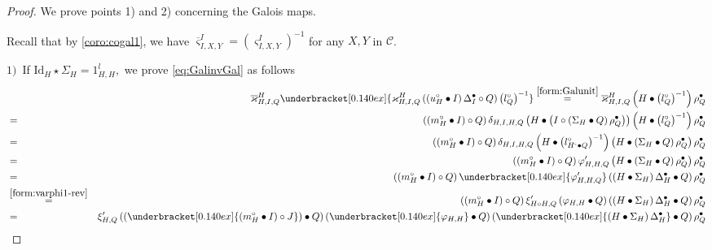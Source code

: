 \documentclass[nosumlimits,twoside]{amsart}
\theoremstyle{definition}
\theoremstyle{remark}
\def\revsn{\text{-}}
\begin{document}
\begin{proof}
We prove points 1) and 2) concerning the Galois maps.

Recall that by \cref{coro:cogal1}, we have $\overline{\varsigma }%
_{I,X,Y}^{I}=\left( \varsigma _{I,X,Y}^{I}\right) ^{-1}$ for any $X,Y$ in $\mathcal{C}$.

$1)$\ If $\mathrm{Id}_{H}\star \Sigma _{H}=1_{H,H}^{l},$ we prove \eqref{eq:GalinvGal} as follows%
\begin{eqnarray*}
&&\overline{\varkappa }_{H,I,Q}^{H}\underbracket[0.140ex]{\varkappa _{H,I,Q}^{H}\left(
\left( u_{H}^{\circ }\bullet I\right) \Delta _{I}^{\bullet }\circ Q\right)
\left( l_{Q}^{\circ }\right) ^{-1}}\overset{\eqref{form:Galunit}}{=}\overline{%
\varkappa }_{H,I,Q}^{H}\left( H\bullet \left( l_{Q}^{\circ }\right)
^{-1}\right) \rho _{Q}^{\bullet } \\
&=&\left( \left( m_{H}^{\circ }\bullet I\right) \circ Q\right) \delta
_{H,I,H,Q}\left( H\bullet \left( I\circ \left( \Sigma _{H}\bullet Q\right)
\rho _{Q}^{\bullet }\right) \right) \left( H\bullet \left( l_{Q}^{\circ
}\right) ^{-1}\right) \rho _{Q}^{\bullet } \\
&=&\left( \left( m_{H}^{\circ }\bullet I\right) \circ Q\right) \delta
_{H,I,H,Q}\left( H\bullet \left( l_{H^{\revsn}\bullet Q}^{\circ }\right)
^{-1}\right) \left( H\bullet \left( \Sigma _{H}\bullet Q\right) \rho
_{Q}^{\bullet }\right) \rho _{Q}^{\bullet } \\
&=&\left( \left( m_{H}^{\circ }\bullet I\right) \circ Q\right) \varphi
_{H,H,Q}^{\prime }\left( H\bullet \left( \Sigma _{H}\bullet Q\right) \rho
_{Q}^{\bullet }\right) \rho _{Q}^{\bullet } \\
&=&\left( \left( m_{H}^{\circ }\bullet I\right) \circ Q\right) %
\underbracket[0.140ex]{\varphi _{H,H,Q}^{\prime }}\left( \left( H\bullet
\Sigma _{H}\right) \Delta _{H}^{\bullet }\bullet Q\right) \rho _{Q}^{\bullet
} \\
&\overset{\eqref{form:varphi1-rev}}{=}&\left( \left( m_{H}^{\circ }\bullet
I\right) \circ Q\right) \xi _{H\circ H,Q}^{\prime }\left( \varphi
_{H,H}\bullet Q\right) \left( \left( H\bullet \Sigma _{H}\right) \Delta
_{H}^{\bullet }\bullet Q\right) \rho _{Q}^{\bullet } \\
&=&\xi _{H,Q}^{\prime }\left( \left( \underbracket[0.140ex]{\left(
m_{H}^{\circ }\bullet I\right) \circ J}\right) \bullet Q\right) \left( %
\underbracket[0.140ex]{\varphi _{H,H}}\bullet Q\right) \left( %
\underbracket[0.140ex]{\left( H\bullet \Sigma _{H}\right) \Delta
_{H}^{\bullet }}\bullet Q\right) \rho _{Q}^{\bullet } \\

\end{eqnarray*}
\end{proof}
\end{document}
